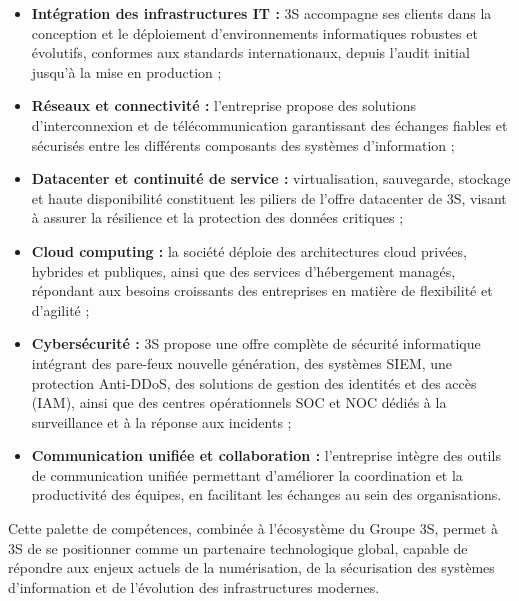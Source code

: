 \begin{itemize}

    \item \textbf{Intégration des infrastructures IT :}
    3S accompagne ses clients dans la conception et le déploiement d'environnements informatiques robustes et évolutifs, conformes aux standards internationaux, depuis l'audit initial jusqu'à la mise en production ;

    \item \textbf{Réseaux et connectivité :}
    l'entreprise propose des solutions d'interconnexion et de télécommunication garantissant des échanges fiables et sécurisés entre les différents composants des systèmes d'information ;

    \item \textbf{Datacenter et continuité de service :}
    virtualisation, sauvegarde, stockage et haute disponibilité constituent les piliers de l'offre datacenter de 3S, visant à assurer la résilience et la protection des données critiques ;

    \item \textbf{Cloud computing :}
    la société déploie des architectures cloud privées, hybrides et publiques, ainsi que des services d'hébergement managés, répondant aux besoins croissants des entreprises en matière de flexibilité et d'agilité ;

    \item \textbf{Cybersécurité :}
    3S propose une offre complète de sécurité informatique intégrant des pare-feux nouvelle génération, des systèmes SIEM, une protection Anti-DDoS, des solutions de gestion des identités et des accès (IAM), ainsi que des centres opérationnels SOC et NOC dédiés à la surveillance et à la réponse aux incidents ;

    \item \textbf{Communication unifiée et collaboration :}
    l'entreprise intègre des outils de communication unifiée permettant d'améliorer la coordination et la productivité des équipes, en facilitant les échanges au sein des organisations.

\end{itemize}

Cette palette de compétences, combinée à l'écosystème du Groupe 3S, permet à 3S de se positionner comme un partenaire technologique global, capable de répondre aux enjeux actuels de la numérisation, de la sécurisation des systèmes d'information et de l'évolution des infrastructures modernes.


